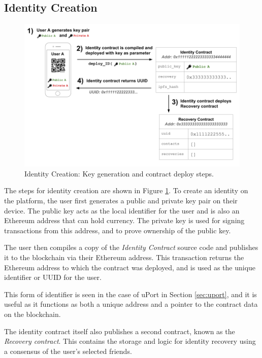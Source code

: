 \subsection{Identity Creation}
\begin{figure}[ht]
\centering
     \includegraphics[width=1.0\textwidth]{./images/DiagramSignup.png}
      \caption{Identity Creation: Key generation and contract deploy steps.}
       \label{fig:diagram-signup}
\end{figure}

The steps for identity creation are shown in Figure \ref{fig:diagram-signup}. To create an identity on the platform, the user first generates a public and private key pair on their device. The public key acts as the local identifier for the user and is also an Ethereum address that can hold currency. The private key is used for signing transactions from this address, and to prove ownership of the public key.

The user then compiles a copy of the \textit{Identity Contract} source code and publishes it to the blockchain via their Ethereum address. This transaction returns the Ethereum address to which the contract was deployed, and is used as the unique identifier or \ac{UUID} for the user. 

This form of identifier is seen in the case of uPort in Section \ref{sec:uport}, and it is useful as it functions as both a unique address and a pointer to the contract data on the blockchain.

The identity contract itself also publishes a second contract, known as the \textit{Recovery contract}. This contains the storage and logic for identity recovery using a consensus of the user's selected friends.


